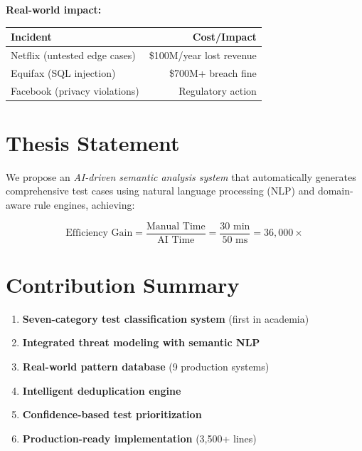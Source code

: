 \documentclass[12pt,oneside]{report}
\begin{document}
\textbf{Real-world impact:}
\begin{table}[H]
\centering
\begin{tabular}{|l|r|}
\hline
\textbf{Incident} & \textbf{Cost/Impact} \\
\hline
Netflix (untested edge cases) & \$100M/year lost revenue \\
Equifax (SQL injection) & \$700M+ breach fine \\
Facebook (privacy violations) & Regulatory action \\
\hline
\end{tabular}
\end{table}

\section{Thesis Statement}

We propose an \textit{AI-driven semantic analysis system} that automatically generates 
comprehensive test cases using natural language processing (NLP) and domain-aware rule 
engines, achieving:

\begin{equation}
\text{Efficiency Gain} = \frac{\text{Manual Time}}{\text{AI Time}} = \frac{30 \text{ min}}{50 \text{ ms}} = 36,000\times
\end{equation}

\section{Contribution Summary}

\begin{enumerate}
    \item \textbf{Seven-category test classification system} (first in academia)
    \item \textbf{Integrated threat modeling with semantic NLP}
    \item \textbf{Real-world pattern database} (9 production systems)
    \item \textbf{Intelligent deduplication engine}
    \item \textbf{Confidence-based test prioritization}
    \item \textbf{Production-ready implementation} (3,500+ lines)
\end{enumerate}

\end{document}
